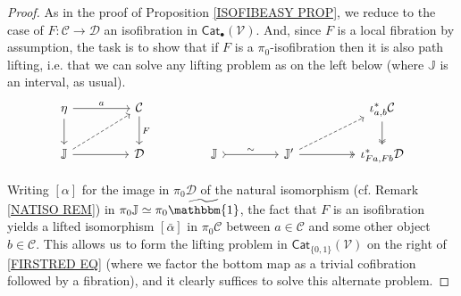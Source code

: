 \documentclass[a4paper,10pt
,draft
]{article}%
\numberwithin{equation}{section}
\numberwithin{figure}{section}
\theoremstyle{definition} %
\newcommand{\V}{\ensuremath{\mathcal V}}
\newcommand{\1}{\ensuremath{\mathbbm 1}}%
\begin{document}
\begin{proof}
	As in the proof of Proposition \ref{ISOFIBEASY PROP},
	we reduce to the case of $F \colon \mathcal{C} \to \mathcal{D}$
	an isofibration in $\mathsf{Cat}_{\bullet}(\V)$.
	And, since $F$ is a local fibration by assumption, 
	the task is to show that if
	$F$ is a $\pi_0$-isofibration then it is also path lifting, 
	i.e. that we can solve any lifting problem as on the left below
	(where $\mathbb{J}$ is an interval, as usual).
	\begin{equation}\label{FIRSTRED EQ}
	\begin{tikzcd}[column sep = 45pt]
	\eta \ar{d} \ar{r}{a}
	&
	\mathcal{C} \ar{d}{F}
	&%
	&
	&
	\iota^{\**}_{a,b} \mathcal{C} \ar[twoheadrightarrow]{d}
	\\
	\mathbb{J} \ar{r} \ar[dashed]{ru}
	&
	\mathcal{D}
	&%
	\mathbb{J} \ar[rightarrowtail]{r}{\sim}
	&
	\mathbb{J}' \ar[twoheadrightarrow]{r} \ar[dashed]{ru}
	&
	\iota^{\**}_{Fa,Fb} \mathcal{D}
	\end{tikzcd}
	\end{equation}
	
	Writing $[\alpha]$ for the image in
	$\pi_0 \mathcal{D}$
	of the natural isomorphism (cf. Remark \ref{NATISO REM})
	in $\pi_0 \mathbb{J} \simeq \pi_0 \widetilde{\mathbbm{1}}$,
	the fact that $F$ is an isofibration
	yields a lifted isomorphism
	$[\bar{\alpha}]$ in $\pi_0 \mathcal{C}$
	between $a \in \mathcal{C}$ and some other object $b \in \mathcal{C}$.
	This allows us to form the lifting problem 
	in $\mathsf{Cat}_{\{0,1\}}(\V)$
	on the right of 
	\eqref{FIRSTRED EQ}
	(where we factor the bottom map as a trivial cofibration followed by a fibration),
	and it clearly suffices to solve this alternate problem.
	

\end{proof}
\end{document}
